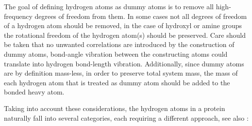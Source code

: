 The goal of defining hydrogen atoms as dummy atoms is to remove all
high-frequency degrees of freedom from them. In some cases not all
degrees of freedom of a hydrogen atom should be removed, {\eg} in the
case of hydroxyl or amine groups the rotational freedom of the
hydrogen atom(s) should be preserved. Care should be taken that no
unwanted correlations are introduced by the construction of dummy
atoms, {\eg} bond-angle vibration between the constructing atoms could
translate into hydrogen bond-length vibration. Additionally, since
dummy atoms are by definition mass-less, in order to preserve total
system mass, the mass of each hydrogen atom that is treated as dummy
atom should be added to the bonded heavy atom.

Taking into account these considerations, the hydrogen atoms in a
protein naturally fall into several categories, each requiring a
different approach, see also :


